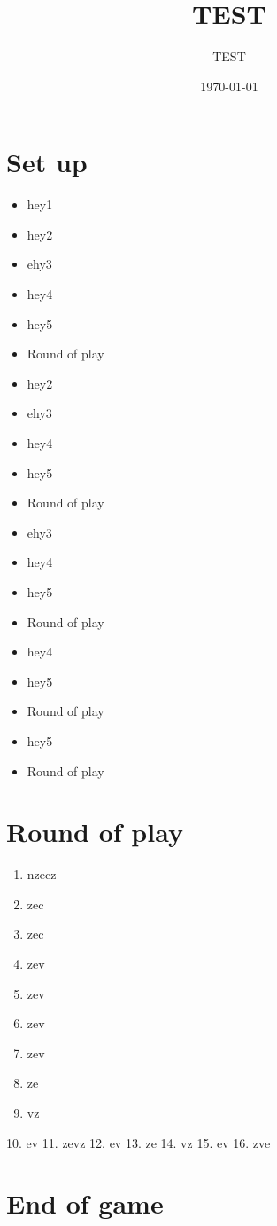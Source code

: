 \documentclass{article}%
\title{TEST}%
\author{TEST}%
\date{\today}%
\begin{document}
%
\pagestyle{empty}%
\normalsize%
\maketitle%
\section{ Set up
}%
\label{sec:Setup}%
\begin{itemize}%
\item%
 hey1
%
\item%
 hey2
%
\item%
 ehy3
%
\item%
 hey4
%
\item%
 hey5
%
\item%
 Round of play
%
\end{itemize}%
\begin{itemize}%
\item%
 hey2
%
\item%
 ehy3
%
\item%
 hey4
%
\item%
 hey5
%
\item%
 Round of play
%
\end{itemize}%
\begin{itemize}%
\item%
 ehy3
%
\item%
 hey4
%
\item%
 hey5
%
\item%
 Round of play
%
\end{itemize}%
\begin{itemize}%
\item%
 hey4
%
\item%
 hey5
%
\item%
 Round of play
%
\end{itemize}%
\begin{itemize}%
\item%
 hey5
%
\item%
 Round of play
%
\end{itemize}

%
\section{ Round of play
}%
\label{sec:Roundofplay}%
\begin{enumerate}%
\item%
 nzecz
%
\item%
 zec
%
\item%
 zec
%
\item%
 zev
%
\item%
 zev
%
\item%
 zev
%
\item%
 zev
%
\item%
 ze
%
\item%
 vz
%
\end{enumerate}%
10. ev
%
11. zevz
%
12. ev
%
13. ze
%
14. vz
%
15. ev
%
16. zve


%
\section{ End of game}%
\label{sec:Endofgame}%

%
\end{document}
